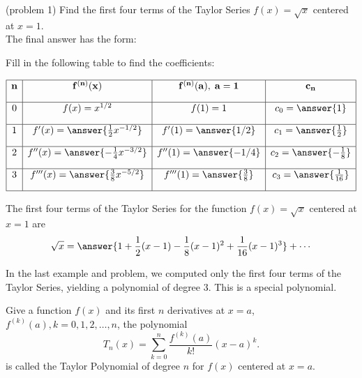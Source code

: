 \documentclass[handout]{ximera}
\begin{document}
\begin{problem}(problem 1) Find the first four terms of the Taylor Series $f(x) = \sqrt x$ centered at $x = 1$.\\

The final answer has the form:
\begin{center}
\begin{multipleChoice}
\end{multipleChoice}
\end{center}

Fill in the following table to find the coefficients:

\[
\begin{array}{|c|c|c|c|} 
\hline
\bf{n} & \bf{f^{(n)}(x)} & \bf{f^{(n)}(a),\; a = 1} & \bf{c_n} \\[1em] 
\hline
 0 & f(x) = x^{1/2} & f(1) = 1 & c_0 = \answer{1} \\[1em]
\hline
1 & f'(x) = \answer{\frac12 x^{-1/2}} & f'(1) = \answer{1/2} & c_1 = \answer{\frac12} \\[1em]
\hline
 2 & f''(x) =\answer{-\frac14 x^{-3/2}} & f''(1) = \answer{-1/4} & c_2 = \answer{-\frac{1}{8}} \\[1em]
\hline
 3 & f'''(x) =\answer{\frac38 x^{-5/2}} & f'''(1) = \answer{\frac38 } & c_3 = \answer{\frac{1}{16}}\\[1em]
\hline
\end{array}
\]


The first four terms of the Taylor Series for the function $f(x) = \sqrt x$ centered at $x = 1$ are
\[
\sqrt x = \answer{1 + \frac12(x-1) -\frac{1}{8}(x-1)^2 + \frac{1}{16}(x-1)^3} + \cdots
\]


\end{problem}


In the last example and problem, we computed only the first four terms of the Taylor Series, yielding a polynomial of degree 3.
This is a special polynomial.

\begin{definition}
Give a function $f(x)$ and its first $n$ derivatives at $x = a$, $f^{(k)}(a), k= 0, 1, 2, \ldots, n$, the polynomial
\[
T_n (x) = \sum_{k=0}^n\frac{f^{(k)}(a)}{k!} (x-a)^k.
\]
is called the Taylor Polynomial of degree $n$ for $f(x)$ centered at $x=a$.
\end{definition}
\end{document}
